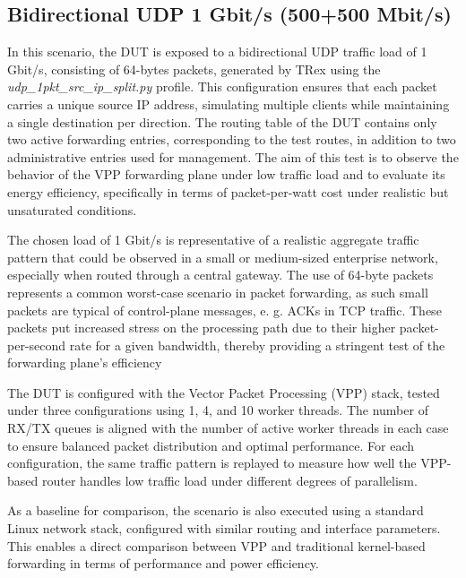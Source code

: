 \subsection{Bidirectional UDP 1 Gbit/s (500+500 Mbit/s)}
In this scenario, the DUT is exposed to a bidirectional UDP traffic load of 1\,Gbit/s, consisting of 64-bytes packets, generated by TRex using the \textit{udp\_1pkt\_src\_ip\_split.py} profile. 
This configuration ensures that each packet carries a unique source IP address, simulating multiple clients while maintaining a single destination per direction. 
The routing table of the DUT contains only two active forwarding entries, corresponding to the test routes, in addition to two administrative entries used for management. 
The aim of this test is to observe the behavior of the VPP forwarding plane under low traffic load and to evaluate its energy efficiency, 
specifically in terms of packet-per-watt cost under realistic but unsaturated conditions.

The chosen load of 1 Gbit/s is representative of a realistic aggregate traffic pattern that could be observed in a small or medium-sized enterprise network, especially when routed through a central gateway.
The use of 64-byte packets represents a common worst-case scenario in packet forwarding, as such small packets are typical of control-plane messages, e. g. ACKs in TCP traffic. 
These packets put increased stress on the processing path due to their higher packet-per-second rate for a given bandwidth, thereby providing a stringent test of the forwarding plane's efficiency

The DUT is configured with the Vector Packet Processing (VPP) stack, tested under three configurations using 1, 4, and 10 worker threads. 
The number of RX/TX queues is aligned with the number of active worker threads in each case to ensure balanced packet distribution and optimal performance. 
For each configuration, the same traffic pattern is replayed to measure how well the VPP-based router handles low traffic load under different degrees of parallelism.

As a baseline for comparison, the scenario is also executed using a standard Linux network stack, configured with similar routing and interface parameters. 
This enables a direct comparison between VPP and traditional kernel-based forwarding in terms of performance and power efficiency.

